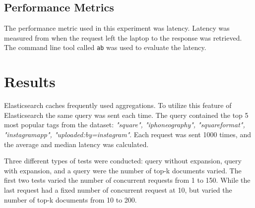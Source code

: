 \subsection{Performance Metrics}
The performance metric used in this experiment was latency.
Latency was measured from when the request left the laptop to the response was retrieved.
The command line tool called \texttt{ab} \cite{apache-benchmark} was used to evaluate the latency.




\section{Results}
Elasticsearch caches frequently used aggregations.
To utilize this feature of Elasticsearch the same query was sent each time.
The query contained the top 5 most popular tags from the dataset: \textit{"square", "iphoneography", "squareformat", "instagramapp", "uploaded:by=instagram"}.
Each request was sent 1000 times, and the average and median latency was calculated.

Three different types of tests were conducted: query without expansion, query with expansion, and a query were the number of top-k documents varied.
The first two tests varied the number of concurrent requests from 1 to 150.
While the last request had a fixed number of concurrent request at 10,
but varied the number of top-k documents from 10 to 200.

